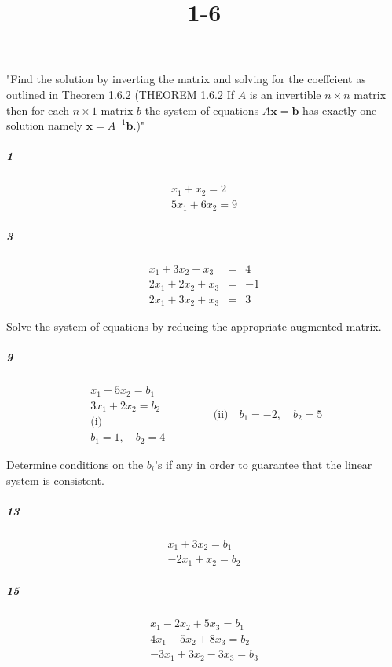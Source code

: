 \documentclass[fleqn]{article}
\title{1-6}
\begin{document}
\maketitle
\pagebreak
 "Find the solution by inverting the matrix and solving for the coeffcient as outlined in Theorem 1.6.2 (THEOREM 1.6.2 If $A$ is an invertible $n \times n$ matrix  then for each $n \times 1$ matrix $b$  the system of equations $A\mathbf{x} = \mathbf{b}$ has exactly one solution  namely  $\mathbf{x} = A^{-1}\mathbf{b}$.)"

\subparagraph{1}

\[
\begin{array}{c} x_1 + x_2 = 2 \\ 5x_1 + 6x_2 = 9 \end{array}
\]
\vfill



\subparagraph{3}

\[
\begin{array}{rcl} x_1 + 3x_2 + x_3 & = & 4 \\ 2x_1 + 2x_2 + x_3 & = & -1 \\ 2x_1 + 3x_2 + x_3 & = & 3 \end{array}
\]
\vfill


\pagebreak
 Solve the system of equations by reducing the appropriate augmented matrix.

\subparagraph{9}

\[
\begin{array}{ll} x_1 - 5x_2 = b_1 \\ 3x_1 + 2x_2 = b_2 \\ \text{(i)} \\ b_1 = 1, \quad b_2 = 4 \end{array} \qquad \qquad \text{(ii)} \quad b_1 = -2, \quad b_2 = 5
\]
\vfill

 Determine conditions on the $b_i$'s if any in order to guarantee that the linear system is consistent.

\subparagraph{13}

\[
\begin{array}{c} x_1 + 3x_2 = b_1 \\ -2x_1 + x_2 = b_2 \end{array}
\]
\vfill


\pagebreak


\subparagraph{15}

\[
\begin{array}{c} x_1 - 2x_2 + 5x_3 = b_1 \\ 4x_1 - 5x_2 + 8x_3 = b_2 \\ -3x_1 + 3x_2 - 3x_3 = b_3 \end{array}
\]
\vfill
\end{document}

